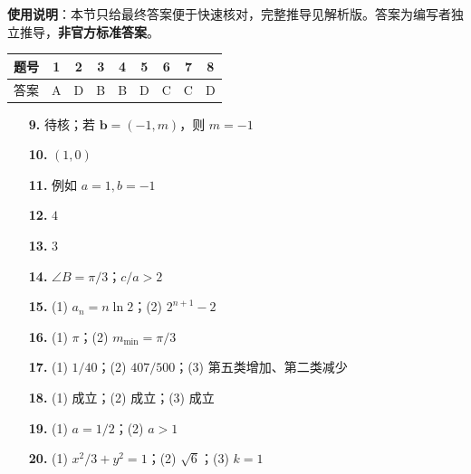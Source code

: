 
\begin{gknotice}
\textbf{使用说明}：本节只给最终答案便于快速核对，完整推导见解析版。答案为编写者独立推导，\textbf{非官方标准答案}。
\end{gknotice}

\begin{center}\begin{tabular}{ccccccccc}
\toprule
题号 & 1 & 2 & 3 & 4 & 5 & 6 & 7 & 8 \\
\midrule
答案 & A & D & B & B & D & C & C & D \\
\bottomrule
\end{tabular}\end{center}

\begin{itemize}[leftmargin=2.6em]
  \item[\textbf{9.}] 待核；若 $\boldsymbol b=(-1,m)$，则 $m=-1$
  \item[\textbf{10.}] $(1,0)$
  \item[\textbf{11.}] 例如 $a=1,b=-1$
  \item[\textbf{12.}] $4$
  \item[\textbf{13.}] $3$
  \item[\textbf{14.}] $\angle B=\pi/3$；$c/a>2$
\end{itemize}

\begin{itemize}[leftmargin=2.6em]
  \item[\textbf{15.}] (1) $a_n=n\ln2$；(2) $2^{n+1}-2$
  \item[\textbf{16.}] (1) $\pi$；(2) $m_{\min}=\pi/3$
  \item[\textbf{17.}] (1) $1/40$；(2) $407/500$；(3) 第五类增加、第二类减少
  \item[\textbf{18.}] (1) 成立；(2) 成立；(3) 成立
  \item[\textbf{19.}] (1) $a=1/2$；(2) $a>1$
  \item[\textbf{20.}] (1) $x^2/3+y^2=1$；(2) $\sqrt6$；(3) $k=1$
\end{itemize}
